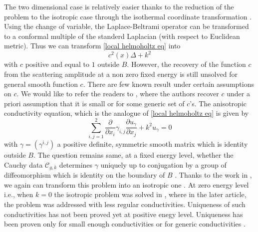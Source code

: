 \documentclass[12pt]{amsart}
\numberwithin{equation}{section}
\theoremstyle{definition}
\theoremstyle{remark}
\numberwithin{equation}{section}
\begin{document}
	
	The two dimensional case is relatively easier thanks to the reduction of the problem to the isotropic case through the isothermal coordinate transformation \cite{ahlfors1966quasiconformal}. Using the change of variable, the Laplace-Beltrami operator  can be transformed to a conformal multiple of the standerd Laplacian (with respect to Euclidean metric). Thus we can transform \eqref{local helmoholtz eq} into
	\[
	c^2(x)\Delta+k^2
	\]
	with $c$ positive and equal to $1$ outside $B$. However, the recovery of the function $c$ from the scattering amplitude at a non zero fixed energy is still unsolved for general smooth function $c$. There are few known result under certain assumptions on $c$. We would like to refer the readers to \cite{sylvester1986uniqueness, sun1991generic, sun1990generic}, where the authors recover $c$ under a priori assumption that it is small or for some generic set of $c$'s.  The anisotropic conductivity equation, which is the analogue of \eqref{local helmoholtz eq} is given by
	\[
	\sum\limits_{i,j=1}^2 \frac{\partial}{\partial x_i} \gamma_{i,j}\frac{\partial u_{\gamma}}{\partial x_j}+k^2 u_{\gamma}=0
	\]
	with $\gamma=(\gamma^{i,j})$ a positive definite, symmetric smooth matrix which is identity outside $B$. The question remains same, at a fixed energy level, whether the Cauchy data $\mathcal{C}_{g,k}$ determines $\gamma$ uniquely up to conjugation by a group of diffeomorphism which is identity on the boundary of $B$ . Thanks to the work in \cite{ahlfors1966quasiconformal}, we again can transform this problem into an isotropic one  \cite{stein1970singular}. At zero energy level i.e., when $k=0$ the isotropic problem was solved in \cite{nachman1996global, brown1997uniqueness}, where in the later article, the problem was addressed with less regular conductivities. Uniqueness of such conductivities has not been proved yet at positive enegy level. Uniqueness has been proven only for small enough conductivities or for generic conductivities \cite{sun1991generic, sun1990generic}.
	
	
	
\end{document}
